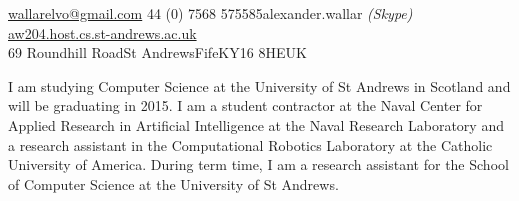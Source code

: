 \documentclass[10pt,a4paper]{article} %
\begin{document}


\noindent\href{mailto:wallarelvo@gmail.com}{wallarelvo@gmail.com}\bull %
\textsmaller{+}44 (0) 7568 575585\bull alexander.wallar \textit{(Skype)}\bull %
\href{http://aw204.host.cs.st-andrews.ac.uk}{aw204.host.cs.st-andrews.ac.uk}\\ %
69 Roundhill Road\bull St Andrews\bull Fife\bull KY16 8HE\bull UK %

\spacedhrule{0.9em}{-0.4em} %



\vspace{-1.3em} %

\begin{multicols}{2}  %

I am studying Computer Science at the University of St
Andrews in Scotland and will be graduating in 2015. I am a student contractor at the Naval Center for Applied Research in Artificial Intelligence at the Naval Research Laboratory and a research assistant in
the Computational Robotics Laboratory at the Catholic University of America. During term time, I am a research assistant for the School of
Computer Science at the University of St Andrews.

\end{multicols}

\spacedhrule{0.5em}{-0.4em} %


\end{document}
